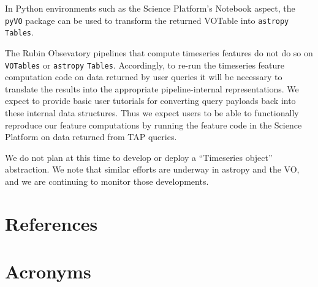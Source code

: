 \documentclass[DM,authoryear,toc]{lsstdoc}
\begin{document}
In Python environments such as the Science Platform's Notebook aspect, the \texttt{pyVO} package can be used to transform the returned VOTable into \texttt{astropy} \texttt{Tables}.

The Rubin Obsevatory pipelines that compute timeseries features do not do so on \texttt{VOTables} or \texttt{astropy} \texttt{Tables}.
Accordingly, to re-run the timeseries feature computation code on data returned by user queries it will be necessary to translate the results into the appropriate pipeline-internal representations.
We expect to provide basic user tutorials for converting query payloads back into these internal data structures.
Thus we expect users to be able to functionally reproduce our feature computations by running the feature code in the Science Platform on data returned from TAP queries. 

We do not plan at this time to develop or deploy a ``Timeseries object'' abstraction.
We note that similar efforts are underway in astropy and the VO, and we are continuing to monitor those developments.

\appendix
\section{References} \label{sec:bib}


\section{Acronyms} \label{sec:acronyms}

\end{document}

